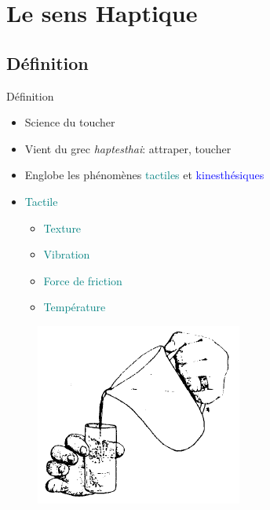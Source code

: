 \section{Le sens Haptique}
\subsection{Définition}
{
\begin{frame}{Définition}
	\begin{itemize}
		\item Science du toucher
		\item Vient du grec \textit{haptesthai}: attraper, toucher
		\item Englobe les phénomènes \textcolor{teal}{tactiles} et \textcolor{blue}{kinesthésiques}%
	\end{itemize}
	
\begin{multicols}{3}

\begin{itemize}
\item \textcolor{teal}{Tactile}
\begin{itemize}
\setlength{\itemindent}{-0.5em}
\item \textcolor{teal}{Texture}
\item \textcolor{teal}{Vibration}
\item \textcolor{teal}{Force de friction}
\item \textcolor{teal}{Température}
\end{itemize}
\end{itemize}

\begin{figure}
		\centering			
		\includegraphics[width=\linewidth]{images/haptic}
	\end{figure}


\end{multicols}
\end{frame}}
